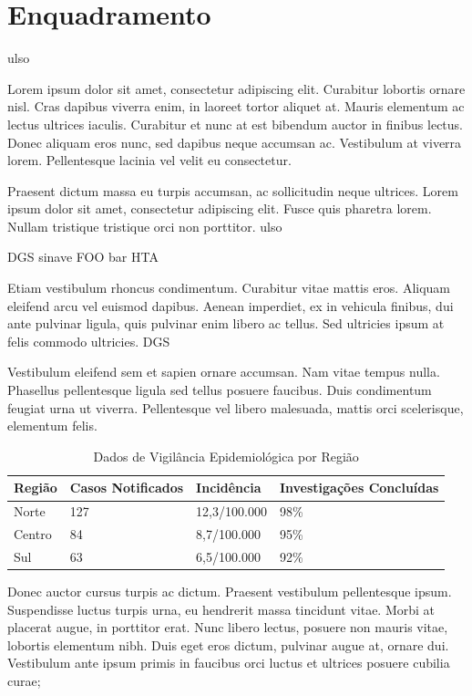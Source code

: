 \section{Enquadramento}\label{sec:enquadramento}

\gls{ulso}

Lorem ipsum dolor sit amet, consectetur adipiscing elit. Curabitur lobortis ornare nisl. Cras dapibus viverra enim, in laoreet tortor aliquet at. Mauris elementum ac lectus ultrices iaculis. Curabitur et nunc at est bibendum auctor in finibus lectus. Donec aliquam eros nunc, sed dapibus neque accumsan ac. Vestibulum at viverra lorem. Pellentesque lacinia vel velit eu consectetur.  

Praesent dictum massa eu turpis accumsan, ac sollicitudin neque ultrices. Lorem ipsum dolor sit amet, consectetur adipiscing elit. Fusce quis pharetra lorem. Nullam tristique tristique orci non porttitor. \gls{ulso}

\gls{DGS}
\gls{sinave}
\gls{FOO}
\gls{bar}
\gls{HTA}

Etiam vestibulum rhoncus condimentum. Curabitur vitae mattis eros. Aliquam eleifend arcu vel euismod dapibus. Aenean imperdiet, ex in vehicula finibus, dui ante pulvinar ligula, quis pulvinar enim libero ac tellus. Sed ultricies ipsum at felis commodo ultricies. \acrshort{DGS}

Vestibulum eleifend sem et sapien ornare accumsan. Nam vitae tempus nulla. Phasellus pellentesque ligula sed tellus posuere faucibus. Duis condimentum feugiat urna ut viverra. Pellentesque vel libero malesuada, mattis orci scelerisque, elementum felis. 

\begin{table}[htbp]
\caption{Dados de Vigilância Epidemiológica por Região}
\label{tab:dados-vigilancia}
\centering
\begin{tabular}{|p{3cm}|p{3cm}|p{3cm}|p{3cm}|}
\hline
\rowcolor{tableheader} 
\textbf{Região} & \textbf{Casos Notificados} & \textbf{Incidência} & \textbf{Investigações Concluídas} \\
\hline
Norte & 127 & 12,3/100.000 & 98\% \\
\hline
Centro & 84 & 8,7/100.000 & 95\% \\
\hline
Sul & 63 & 6,5/100.000 & 92\% \\
\hline
\end{tabular}
\end{table}



Donec auctor cursus turpis ac dictum. Praesent vestibulum pellentesque ipsum. Suspendisse luctus turpis urna, eu hendrerit massa tincidunt vitae. Morbi at placerat augue, in porttitor erat. Nunc libero lectus, posuere non mauris vitae, lobortis elementum nibh. Duis eget eros dictum, pulvinar augue at, ornare dui. Vestibulum ante ipsum primis in faucibus orci luctus et ultrices posuere cubilia curae;

